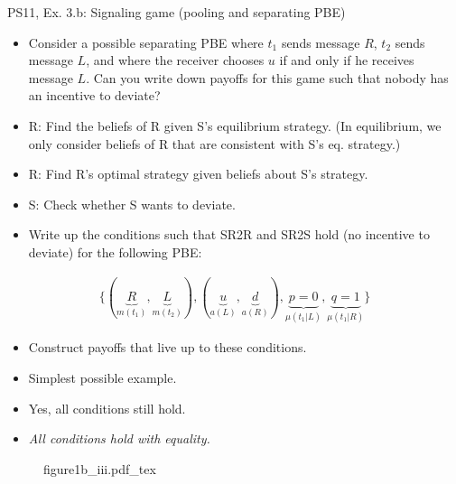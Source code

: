 \begin{frame}{PS11, Ex. 3.b: Signaling game (pooling and separating PBE)}
    \begin{itemize}
        \item[(b)] Consider a possible separating PBE where $t_1$ sends message $R$, $t_2$ sends message $L$, and where the receiver chooses $u$ if and only if he receives message $L$. Can you write down payoffs for this game such that nobody has an incentive to deviate?
    \end{itemize} \vspace{-8pt}
    \begin{multicols}{2}
      \begin{itemize}
        \item[SR3:] R: Find the beliefs of R given S's equilibrium strategy. (In equilibrium, we only consider beliefs of R that are consistent with S's eq. strategy.)
        \item[SR2R:] R: Find R's optimal strategy given beliefs about S's strategy.
        \item[SR2S:] S: Check whether S wants to deviate.
        \item[PBE:]  Write up the conditions such that SR2R and SR2S hold (no incentive to deviate) for the following PBE:
      \end{itemize}\vspace{-14pt}
      \begin{align*}
        \{(\underbrace{R}_{m(t_1)},\underbrace{L}_{m(t_2)}),(\underbrace{u}_{a(L)},\underbrace{d}_{a(R)}),\underbrace{p=0}_{\mu(t_1|L)},\underbrace{q=1}_{\mu(t_1|R)}\}
      \end{align*}\vspace{-12pt}
      \begin{itemize}
        \item[$\rightarrow$] Construct payoffs that live up to these conditions.
        \item[i:] Simplest possible example.
        \item[ii:] Yes, all conditions still hold.
        \item[iii:] \textit{All conditions hold with equality.}
      \end{itemize}
      \vfill\null\columnbreak
      \begin{figure}[!h]
        \center{}
        {figure1b_iii.pdf_tex}
      \end{figure} \vspace{-8pt}
      \begin{itemize}

\end{itemize}
\end{multicols}
\end{frame}
